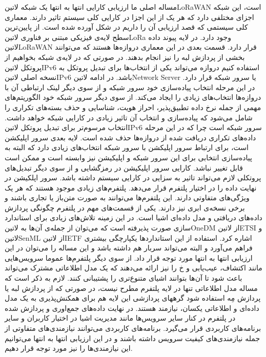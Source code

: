 مساله اصلی ما ارزیابی کارایی انتها به انتها یک شبکه ‌لاتین{LoRaWAN} است، این شبکه اجزای مختلفی دارد که هر یک از این اجزا در کارایی کلی سیستم تاثیر دارند.
معماری کلی سیستمی که قصد ارزیابی آن را داریم در شکل  آورده شده است.
از پایین‌ترین سطح لایه‌ی فیزیکی مبتنی بر فناوری ‌لاتین{LoRa} وجود دارد.
در لایه پیوند داده ‌لاتین{LoRaWAN} قرار دارد.
قسمت بعدی در این معماری دروازه‌ها هستند که می‌توانند بخشی از پردازش لبه را نیز انجام بدهند. در صورتی که در لایه‌ی شبکه بخواهیم از پروتکل ‌لاتین{IPv6} استفاده کنیم
دروازه می‌تواند یکی از انتخاب‌ها برای تبدیل پروتکل به نسخه اصلی ‌لاتین{IPv6} باشد.
در ادامه ‌لاتین{Network Server} یا سرور شبکه قرار دارد. در این مرحله انتخاب پیاده‌سازی خود سرور شبکه و از سوی دیگر لینک ارتباطی آن با
دروازه‌ها انتخاب‌های زیادی را ایجاد می‌کند. از سوی دیگر سرور شبکه خود الگوریتم‌های مهمی از جمله نرخ داده تطبیق‌پذیر، احراز هویت، شناسایی و حذف بسته‌های تکراری را شامل می‌شود
که پیاده‌سازی و انتخاب آن تاثیر زیادی در کارایی شبکه خواهد داشت. انتخاب مرسوم‌تر برای تبدیل پروتکل ‌لاتین{IPv6} سرور شبکه است چرا که در این مرحله داده‌های تکراری دریافت شده از
دروازه‌ها حذف شده است.
لایه بعدی سرور اپلیکشن است، برای ارتباط سرور اپلیکشن با سرور شبکه انتخاب‌های زیادی دارد که البته به پیاده‌سازی انتخابی برای این سرور شبکه و اپلیکیشن نیز وابسته است
و ممکن است قابل تغییر نباشد. کارایی سرور اپلیکیشن در رمزگشایی و از سوی دیگر تبدیل‌های پروتکلی لازم می‌تواند تاثیر به سزایی در کارایی سیستم داشته باشد.
سرور اپلکیشن در نهایت داده را در اختیار پلتفرم قرار می‌دهد. پلتفرم‌های زیادی موجود هستند که هر یک ویژگی‌های متفاوتی دارند.
این پلتفرم‌ها می‌توانند به صورت متن‌باز یا تجاری باشند و برخی نسخه‌ی ابری نیز دارند.
یکی از قسمت‌های مهم
در پلتفرم چگونگی پردازش داده‌های دریافتی و مدل داده‌ای اشیا است. در این زمینه تلاش‌های زیادی برای استاندارد سازی صورت پذیرفته است که می‌توان از
جمله‌ی آن‌ها به ‌لاتین{OneDM} از ‌لاتین{ETSI} و ‌لاتین{SenML} از ‌لاتین{IETF} اشاره کرد. استفاده از این استانداردها یکپارچگی
بیشتری فراهم می‌آورد و البته می‌تواند سربار هم داشته باشد و این مساله را می‌توان در این ارزیابی انتها به انتها مورد توجه قرار داد.
از سوی دیگر پلتفرم‌ها عموما سرویس‌هایی مانند اکتشاف، عیب‌یابی و ‌خ را نیز ارائه می‌دهند که یک مدل اطلاعاتی مشترک می‌تواند باعث شود تا آن‌ها
بتوانند اشیای متنوع‌تری را پشتیبانی کنند.
لازم به ذکر است که مساله مدل اطلاعاتی تنها در لایه پلتفرم مطرح نیست، در صورتی که از پردازش لبه یا پردازش مِه استفاده شود گرههای پردازشی این لایه
هم برای همکنش‌پذیری به یک مدل داده‌ای و اطلاعاتی یکسان، نیازمند هستند.
در نهایت داده‌های جمع‌اوری و پردازش شده در پلتفرم در کنار سایر سرویس‌ها مانند مدیریت اشیا در اختیار کاربران و سایر برنامه‌های کاربردی قرار می‌گیرد.
برنامه‌های کاربردی می‌توانند نیازمندی‌های متفاوتی از جمله نیازمندی‌های کیفیت سرویس داشته باشند و در این ارزیابی انتها به انتها می‌توانیم این نیازمندی‌ها را
نیز مورد توجه قرار دهیم.


